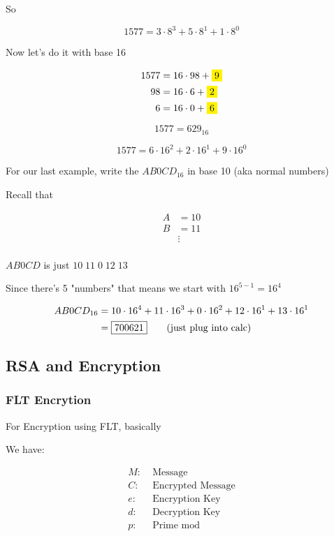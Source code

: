 \documentclass[../../Main.tex]{subfiles}
\begin{document}
So 

$$1577 = 3 \cdot 8^3 + 5 \cdot 8^1 + 1 \cdot 8^0$$

Now let's do it with base 16

\begin{align*}
    1577 &= 16 \cdot 98 + \yellowbox{9} \\
    98 &= 16 \cdot 6 + \yellowbox{2} \\
    6 &= 16 \cdot 0 + \yellowbox{6} \\
\end{align*}

$$\boxed{1577 = 629_{16}}$$

$$1577 = 6 \cdot 16^2 + 2 \cdot 16^1 + 9 \cdot 16^0$$

For our last example, write the $AB0CD_{16}$ in base 10 (aka normal numbers)

Recall that

\begin{align*}
    A &= 10 \\
    B &= 11 \\
    &\vdots \\
\end{align*}

$AB0CD$ is just $10 \; 11 \; 0 \; 12 \; 13$

Since there's 5 "numbers" that means we start with $16^{5 - 1} = 16^4$

\begin{align*}
    AB0CD_{16} &= 10 \cdot 16^4 + 11 \cdot 16^3 + 0 \cdot 16^2 + 12 \cdot 16^1 + 13 \cdot 16^1 \\
    &= \boxed{700621} \tag{\text{just plug into calc}}
\end{align*}

\subsection{RSA and Encryption}

\subsubsection{FLT Encrytion}

For Encryption using FLT, basically

We have:

\begin{align*}
    M: &\; \text{Message} \\
    C: &\; \text{Encrypted Message} \\
    e: &\; \text{Encryption Key} \\
    d: &\; \text{Decryption Key} \\
    p: &\; \text{Prime mod} \\
\end{align*}
\end{document}
